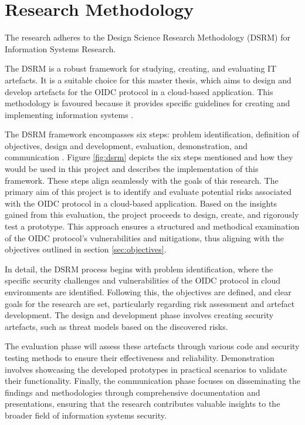 \section{Research Methodology}
The research adheres to the Design Science Research Methodology (DSRM) for Information Systems Research.

The DSRM is a robust framework for studying, creating, and evaluating IT artefacts.
It is a suitable choice for this master thesis, which aims to design and develop artefacts for the OIDC protocol in a cloud-based application.
This methodology is favoured because it provides specific guidelines for creating and implementing information systems \citep{dsrm}.

The DSRM framework encompasses six steps: problem identification, definition of objectives, design and development, evaluation, demonstration, and communication \citep{dsrm}.
Figure \ref{fig:dsrm} depicts the six steps mentioned and how they would be used in this project and describes the implementation of this framework.
These steps align seamlessly with the goals of this research.
The primary aim of this project is to identify and evaluate potential risks associated with the OIDC protocol in a cloud-based application.
Based on the insights gained from this evaluation, the project proceeds to design, create, and rigorously test a prototype.
This approach ensures a structured and methodical examination of the OIDC protocol’s vulnerabilities and mitigations, thus aligning with the objectives outlined in section \ref{sec:objectives}.

In detail, the DSRM process begins with problem identification, where the specific security challenges and vulnerabilities of the OIDC protocol in cloud environments are identified.
Following this, the objectives are defined, and clear goals for the research are set, particularly regarding risk assessment and artefact development.
The design and development phase involves creating security artefacts, such as threat models based on the discovered risks.

The evaluation phase will assess these artefacts through various code and security testing methods to ensure their effectiveness and reliability.
Demonstration involves showcasing the developed prototypes in practical scenarios to validate their functionality.
Finally, the communication phase focuses on disseminating the findings and methodologies through comprehensive documentation and presentations, ensuring that the research contributes valuable insights to the broader field of information systems security.

